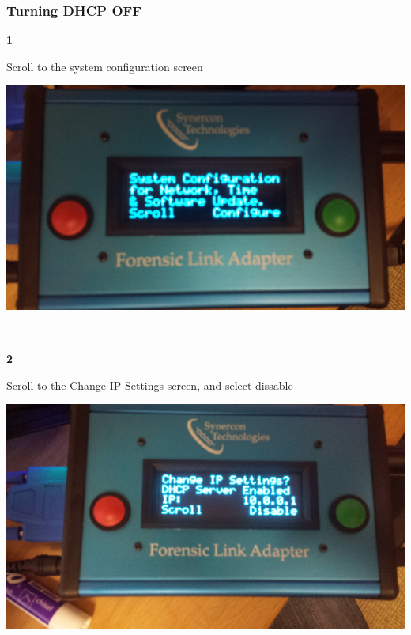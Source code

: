 \documentclass[11pt]{article}
\begin{document}
\subsubsection{Turning DHCP OFF}
\noindent\begin{minipage}{0.3\textwidth}%
\begin{center}
\textbf{1}\\[\baselineskip]
\end{center}
Scroll to the system configuration screen
\end{minipage}%
\hfill%
\begin{minipage}{0.6\textwidth}
\includegraphics[width=\linewidth]{../media/fla_screens/sys_conf}
\end{minipage}
\\[\baselineskip]
\noindent\begin{minipage}{0.3\textwidth}%
\begin{center}
\textbf{2}\\[\baselineskip]
\end{center}
Scroll to the Change IP Settings screen, and select dissable
\end{minipage}%
\hfill%
\begin{minipage}{0.6\textwidth}
\includegraphics[width=\linewidth]{../media/fla_screens/sys_conf_dhcp_enable}
\end{minipage}
\end{document}
